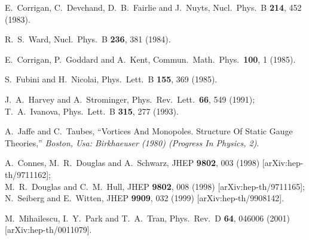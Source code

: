 \documentclass[a4paper,11pt]{article}
\begin{document}
\begin{thebibliography}{99}


E.~Corrigan, C.~Devchand, D.~B.~Fairlie and J.~Nuyts,
Nucl.\ Phys.\ B {\bf 214}, 452 (1983).


R.~S.~Ward,
Nucl.\ Phys.\ B {\bf 236}, 381 (1984).


E.~Corrigan, P.~Goddard and A.~Kent,
Commun.\ Math.\ Phys.\  {\bf 100}, 1 (1985).



S.~Fubini and H.~Nicolai,
Phys.\ Lett.\ B {\bf 155}, 369 (1985).


J.~A.~Harvey and A.~Strominger,
Phys.\ Rev.\ Lett.\  {\bf 66}, 549 (1991);\\
T.~A.~Ivanova,
Phys.\ Lett.\ B {\bf 315}, 277 (1993).




A.~Jaffe and C.~Taubes,
``Vortices And Monopoles. Structure Of Static Gauge Theories,''
{\it  Boston, Usa: Birkhaeuser (1980) %
(Progress In Physics, 2)}.




A.~Connes, M.~R.~Douglas and A.~Schwarz,
JHEP {\bf 9802}, 003 (1998) [arXiv:hep-th/9711162];\\
M.~R.~Douglas and C.~M.~Hull,
JHEP {\bf 9802}, 008 (1998) [arXiv:hep-th/9711165];\\
N.~Seiberg and E.~Witten,
JHEP {\bf 9909}, 032 (1999)
[arXiv:hep-th/9908142].


M.~Mihailescu, I.~Y.~Park and T.~A.~Tran,
Phys.\ Rev.\ D {\bf 64}, 046006 (2001)
[arXiv:hep-th/0011079].



\end{thebibliography}
\end{document}
